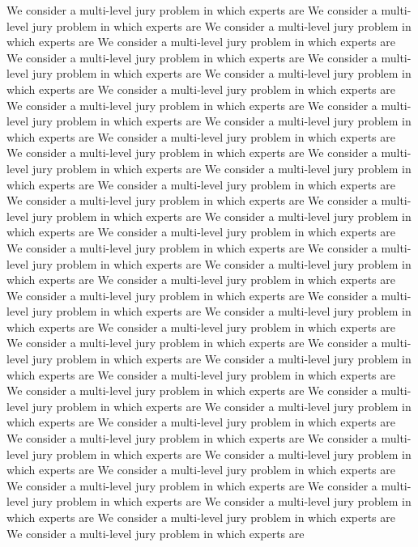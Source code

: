 \documentclass[letterpaper]{article}
\numberwithin{equation}{section}	%
\begin{document}
We consider a multi-level jury problem in which experts are
We consider a multi-level jury problem in which experts are
We consider a multi-level jury problem in which experts are
We consider a multi-level jury problem in which experts are
We consider a multi-level jury problem in which experts are
We consider a multi-level jury problem in which experts are
We consider a multi-level jury problem in which experts are
We consider a multi-level jury problem in which experts are
We consider a multi-level jury problem in which experts are
We consider a multi-level jury problem in which experts are
We consider a multi-level jury problem in which experts are
We consider a multi-level jury problem in which experts are
We consider a multi-level jury problem in which experts are
We consider a multi-level jury problem in which experts are
We consider a multi-level jury problem in which experts are
We consider a multi-level jury problem in which experts are
We consider a multi-level jury problem in which experts are
We consider a multi-level jury problem in which experts are
We consider a multi-level jury problem in which experts are
We consider a multi-level jury problem in which experts are
We consider a multi-level jury problem in which experts are
We consider a multi-level jury problem in which experts are
We consider a multi-level jury problem in which experts are
We consider a multi-level jury problem in which experts are
We consider a multi-level jury problem in which experts are
We consider a multi-level jury problem in which experts are
We consider a multi-level jury problem in which experts are
We consider a multi-level jury problem in which experts are
We consider a multi-level jury problem in which experts are
We consider a multi-level jury problem in which experts are
We consider a multi-level jury problem in which experts are
We consider a multi-level jury problem in which experts are
We consider a multi-level jury problem in which experts are
We consider a multi-level jury problem in which experts are
We consider a multi-level jury problem in which experts are
We consider a multi-level jury problem in which experts are
We consider a multi-level jury problem in which experts are
We consider a multi-level jury problem in which experts are
We consider a multi-level jury problem in which experts are
We consider a multi-level jury problem in which experts are
We consider a multi-level jury problem in which experts are
We consider a multi-level jury problem in which experts are
We consider a multi-level jury problem in which experts are
We consider a multi-level jury problem in which experts are
We consider a multi-level jury problem in which experts are
\clearpage
\end{document}
